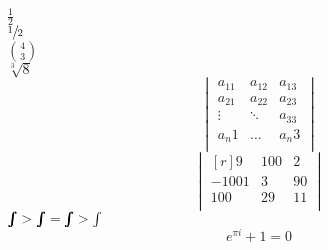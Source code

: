 \documentclass{article}
\begin{document}
	\noindent $\frac{1}{2}$\\
	$\sfrac{1}{2}$\\
	$\binom{4}{3}$\\
	$\sqrt[3]{8}$\\
\[
\begin{vmatrix}
 	a_11 & a_12 & a_13\\
 	a_21 & a_22 & a_23\\
 	\vdots & \ddots & a_33\\
 	a_n1 & \dots & a_n3\\
\end{vmatrix}
\]
\[
\begin{vmatrix*}[r]
	9 & 100 & 2\\
	-1001 & 3 & 90\\
	100 & 29 & 11\\
\end{vmatrix*}
\]
$\hm\int > \bm\int = \pmb\int > \int$
\begin{equation}
	e^{\pi i}+1=0
\end{equation}
\end{document}
